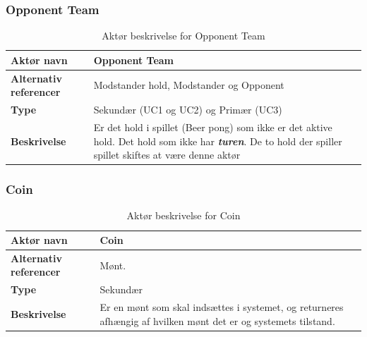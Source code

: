 \documentclass[Kravspecifikation/Kravspec_Main.tex]{subfiles}
\begin{document}
\subsubsection{Opponent Team}
\begin{table}[H]
    \centering
    \begin{tabular}{|L{0.35\textwidth}|L{0.65\textwidth}|}
        \hline
        \textbf{Aktør navn} &  Opponent Team\\ \hline
        \textbf{Alternativ referencer} &  Modstander hold, Modstander og Opponent\\ \hline
        \textbf{Type} & Sekundær (UC1 og UC2) og Primær (UC3) \\ \hline
        \textbf{Beskrivelse} & Er det hold i spillet (Beer pong) som ikke er det aktive hold. Det hold som ikke har \textbf{\textit{turen}}. De to hold der spiller spillet skiftes at være denne aktør\\ \hline
    \end{tabular}
    \caption{Aktør beskrivelse for Opponent Team}
    \label{tab:OppponentTeamBeskrivelse}
\end{table}

\subsubsection{Coin}
\begin{table}[H]
    \centering
    \begin{tabular}{|L{0.35\textwidth}|L{0.65\textwidth}|}
        \hline
        \textbf{Aktør navn} & Coin \\ \hline
        \textbf{Alternativ referencer} & Mønt. \\ \hline
        \textbf{Type} &  Sekundær \\ \hline
        \textbf{Beskrivelse} & Er en mønt som skal indsættes i systemet, og returneres afhængig af hvilken mønt det er og systemets tilstand. \\ \hline
    \end{tabular}
    \caption{Aktør beskrivelse for Coin}
    \label{tab:CoinBeskrivelse}
\end{table}
\end{document}

